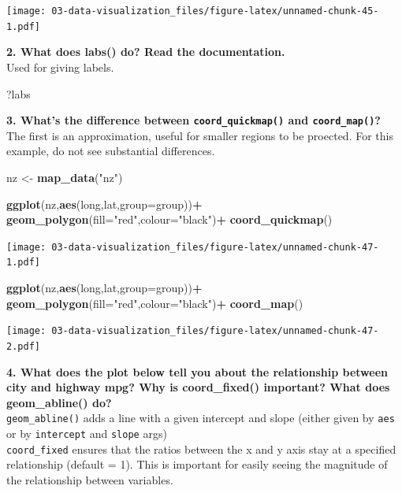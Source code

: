 \documentclass[]{book}
\newenvironment{Shaded}{\begin{snugshade}}{\end{snugshade}}
\newcommand{\DataTypeTok}[1]{\textcolor[rgb]{0.13,0.29,0.53}{#1}}
\newcommand{\KeywordTok}[1]{\textcolor[rgb]{0.13,0.29,0.53}{\textbf{#1}}}
\newcommand{\NormalTok}[1]{#1}
\newcommand{\OperatorTok}[1]{\textcolor[rgb]{0.81,0.36,0.00}{\textbf{#1}}}
\newcommand{\StringTok}[1]{\textcolor[rgb]{0.31,0.60,0.02}{#1}}
\theoremstyle{definition}
\theoremstyle{definition}
\theoremstyle{definition}
\theoremstyle{remark}
\begin{document}
\texttt{[image: 03-data-visualization\_files/figure-latex/unnamed-chunk-45-1.pdf]}

\textbf{2. What does labs() do? Read the documentation.}\\
Used for giving labels.

\begin{Shaded}
\begin{Highlighting}[]
\NormalTok{?labs}
\end{Highlighting}
\end{Shaded}

\textbf{3. What's the difference between \texttt{coord\_quickmap()} and
\texttt{coord\_map()}?}\\
The first is an approximation, useful for smaller regions to be
proected. For this example, do not see substantial differences.

\begin{Shaded}
\begin{Highlighting}[]
\NormalTok{nz <-}\StringTok{ }\KeywordTok{map_data}\NormalTok{(}\StringTok{"nz"}\NormalTok{)}

\KeywordTok{ggplot}\NormalTok{(nz,}\KeywordTok{aes}\NormalTok{(long,lat,}\DataTypeTok{group=}\NormalTok{group))}\OperatorTok{+}
\StringTok{  }\KeywordTok{geom_polygon}\NormalTok{(}\DataTypeTok{fill=}\StringTok{"red"}\NormalTok{,}\DataTypeTok{colour=}\StringTok{"black"}\NormalTok{)}\OperatorTok{+}
\StringTok{  }\KeywordTok{coord_quickmap}\NormalTok{()}
\end{Highlighting}
\end{Shaded}

\texttt{[image: 03-data-visualization\_files/figure-latex/unnamed-chunk-47-1.pdf]}

\begin{Shaded}
\begin{Highlighting}[]
\KeywordTok{ggplot}\NormalTok{(nz,}\KeywordTok{aes}\NormalTok{(long,lat,}\DataTypeTok{group=}\NormalTok{group))}\OperatorTok{+}
\StringTok{  }\KeywordTok{geom_polygon}\NormalTok{(}\DataTypeTok{fill=}\StringTok{"red"}\NormalTok{,}\DataTypeTok{colour=}\StringTok{"black"}\NormalTok{)}\OperatorTok{+}
\StringTok{  }\KeywordTok{coord_map}\NormalTok{()}
\end{Highlighting}
\end{Shaded}

\texttt{[image: 03-data-visualization\_files/figure-latex/unnamed-chunk-47-2.pdf]}

\textbf{4. What does the plot below tell you about the relationship
between city and highway mpg? Why is coord\_fixed() important? What does
geom\_abline() do?}\\
\texttt{geom\_abline()} adds a line with a given intercept and slope
(either given by \texttt{aes} or by \texttt{intercept} and
\texttt{slope} args)\\
\texttt{coord\_fixed} ensures that the ratios between the x and y axis
stay at a specified relationship (default = 1). This is important for
easily seeing the magnitude of the relationship between variables.
\end{document}
